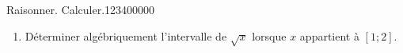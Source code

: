 \begin{pageAD}
\begin{ExoCad}{Raisonner. Calculer.}{1234}{0}{0}{0}{0}{0}
\begin{enumerate}[leftmargin=*]
\item Déterminer algébriquement l'intervalle de $\sqrt{x}$ lorsque $x$ appartient à $\left[1;2 \right]$. 


\end{enumerate}

\end{ExoCad}
 
\end{pageAD} %


